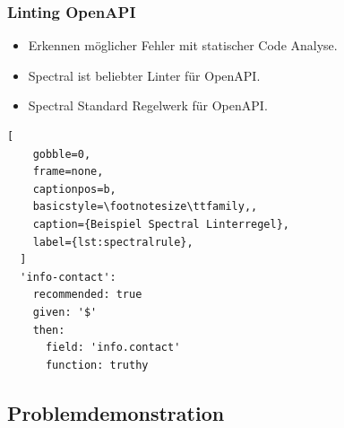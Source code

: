 \begin{frame}[fragile]
  \frametitle{Linting OpenAPI}
  \begin{itemize}
    \item Erkennen möglicher Fehler mit statischer Code Analyse.
    \item Spectral ist beliebter Linter für OpenAPI.
    \item Spectral Standard Regelwerk für OpenAPI.
  \end{itemize}
  \lstset{language=none}
  \begin{lstlisting}[
    gobble=0,
    frame=none,
    captionpos=b,
    basicstyle=\footnotesize\ttfamily,,
    caption={Beispiel Spectral Linterregel},
    label={lst:spectralrule},
  ]
  'info-contact':
    recommended: true
    given: '$'
    then:
      field: 'info.contact'
      function: truthy
  \end{lstlisting}
\end{frame}

\subsection{Problemdemonstration}
\begin{frame}
\end{frame}


